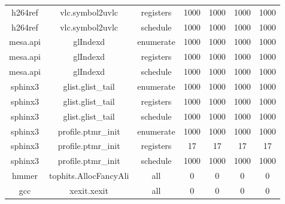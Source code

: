 \begin{center}
\begin{longtable}{c|c|c|c|c|c|c}
		h264ref & vlc.symbol2uvlc & registers & 1000 & 1000 & 1000 & 1000 \\
		h264ref & vlc.symbol2uvlc & schedule & 1000 & 1000 & 1000 & 1000 \\
		\hline
		mesa.api & glIndexd & enumerate & 1000 & 1000 & 1000 & 1000 \\
		mesa.api & glIndexd & registers & 1000 & 1000 & 1000 & 1000 \\
		mesa.api & glIndexd & schedule & 1000 & 1000 & 1000 & 1000 \\
		\hline
		sphinx3 & glist.glist\_tail & enumerate & 1000 & 1000 & 1000 & 1000 \\
		sphinx3 & glist.glist\_tail & registers & 1000 & 1000 & 1000 & 1000 \\
		sphinx3 & glist.glist\_tail & schedule & 1000 & 1000 & 1000 & 1000 \\
		\hline
		sphinx3 & profile.ptmr\_init & enumerate & 1000 & 1000 & 1000 & 1000 \\
		sphinx3 & profile.ptmr\_init & registers & 17 & 17 & 17 & 17 \\
		sphinx3 & profile.ptmr\_init & schedule & 1000 & 1000 & 1000 & 1000 \\
		\hline
		hmmer & tophits.AllocFancyAli & all & 0 &0 &0 &0 \\
		gcc & xexit.xexit & all & 0 &0 &0 &0 \\
	\end{longtable}
	\endgroup
\end{center}

